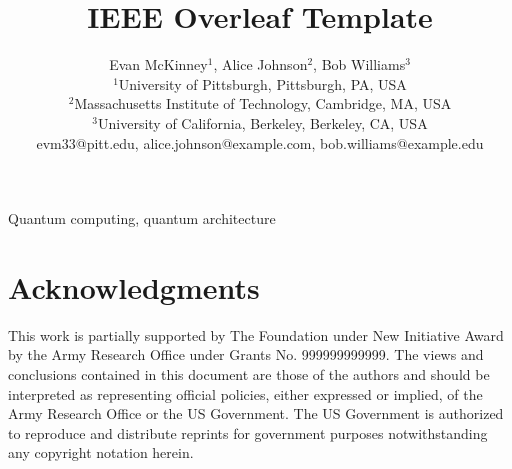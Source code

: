 \documentclass[10pt,conference]{IEEEtran}
\title{IEEE Overleaf Template}
\author{
    Evan McKinney$^{1}$, Alice Johnson$^{2}$, Bob Williams$^{3}$ \\ 
    $^{1}$University of Pittsburgh, Pittsburgh, PA, USA\\
    $^{2}$Massachusetts Institute of Technology, Cambridge, MA, USA\\
    $^{3}$University of California, Berkeley, Berkeley, CA, USA\\
    evm33@pitt.edu, alice.johnson@example.com, bob.williams@example.edu
}
\begin{document}
\maketitle



\begin{IEEEkeywords}
Quantum computing, quantum architecture
\end{IEEEkeywords}




\section*{Acknowledgments}
This work is partially supported by The Foundation under New Initiative Award by the Army Research Office under Grants No. 999999999999. The views and conclusions contained in this document are those of the authors and should be interpreted as representing official policies, either expressed or implied, of the Army Research Office or the US Government. The US Government is authorized to reproduce and distribute reprints for government purposes notwithstanding any copyright notation herein.


\nocite{*}

\end{document}
